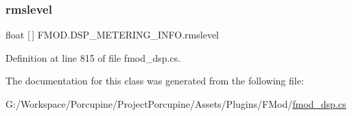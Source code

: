\mbox{\label{class_f_m_o_d_1_1_d_s_p___m_e_t_e_r_i_n_g___i_n_f_o_a43763cecddf4c882368f5d0ec709fd3b}} 
\subsubsection{\texorpdfstring{rmslevel}{rmslevel}}
{\footnotesize\ttfamily float \mbox{[}$\,$\mbox{]} F\+M\+O\+D.\+D\+S\+P\+\_\+\+M\+E\+T\+E\+R\+I\+N\+G\+\_\+\+I\+N\+F\+O.\+rmslevel}



Definition at line 815 of file fmod\+\_\+dsp.\+cs.



The documentation for this class was generated from the following file\+:\begin{DoxyCompactItemize}
\item 
G\+:/\+Workspace/\+Porcupine/\+Project\+Porcupine/\+Assets/\+Plugins/\+F\+Mod/\hyperlink{fmod__dsp_8cs}{fmod\+\_\+dsp.\+cs}\end{DoxyCompactItemize}
